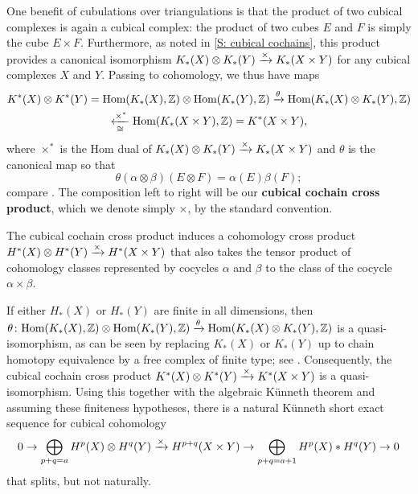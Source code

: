 One benefit of cubulations over triangulations is that the product of two cubical complexes is again a cubical complex: the product of two cubes $E$ and $F$ is simply the cube $E \times F$.
Furthermore, as noted in \cref{S: cubical cochains}, this product provides a canonical isomorphism $K_*(X) \otimes K_*(Y) \xrightarrow{\times} K_*(X \times Y)$ for any cubical complexes $X$ and $Y$.
Passing to cohomology, we thus have maps
\begin{multline*}
	K^*(X) \otimes K^*(Y) = \textup{Hom}(K_*(X), \mathbb{Z}) \otimes \textup{Hom}(K_*(Y), \mathbb{Z}) \xrightarrow{\theta} \textup{Hom}(K_*(X) \otimes K_*(Y),\mathbb{Z}) \\ \underset{\cong}{\xleftarrow{\times^*}} \textup{Hom}(K_*(X \times Y),\mathbb{Z}) = K^*(X \times Y),
\end{multline*}
where $\times^*$ is the Hom dual of $K_*(X) \otimes K_*(Y) \xrightarrow{\times} K_*(X \times Y)$ and $\theta$ is the canonical map so that $$\theta(\alpha \otimes \beta)(E \otimes F) = \alpha(E)\beta(F);$$ compare \cite[Sections 60,61]{Mun84}.
The composition left to right will be our \textbf{cubical cochain cross product}, which we denote simply $\times$, by the standard convention.

The cubical cochain cross product induces a cohomology cross product $H^*(X) \otimes H^*(Y) \xrightarrow{\times} H^*(X \times Y)$ that also takes the tensor product of cohomology classes represented by cocycles $\alpha$ and $\beta$ to the class of the cocycle $\alpha \times \beta$.

If either $H_*(X)$ or $H_*(Y)$ are finite in all dimensions, then $\theta \colon \textup{Hom}(K_*(X), \mathbb{Z}) \otimes \textup{Hom}(K_*(Y), \mathbb{Z}) \xrightarrow{\theta} \textup{Hom}(K_*(X) \otimes K_*(Y),\mathbb{Z})$ is a quasi-isomorphism, as can be seen by replacing $K_*(X)$ or $K_*(Y)$ up to chain homotopy equivalence by a free complex of finite type; see \cite[Lemma 5.5.6 and 5.5.9]{Span81}.
Consequently, the cubical cochain cross product $K^*(X) \otimes K^*(Y) \xrightarrow{\times}  K^*(X \times Y)$ is a quasi-isomorphism.
Using this together with the algebraic K\"unneth theorem \cite[Theorem V.2.1]{HS} and assuming these finiteness hypotheses, there is a natural K\"unneth short exact sequence for cubical cohomology
	\[
	0 \to \bigoplus_{p+q = a}H^p(X) \otimes H^q(Y) \xrightarrow{\times} H^{p+q}(X \times Y) \to \bigoplus_{p+q = a+1} H^p(X)* H^q(Y) \to 0
	\]
that splits, but not naturally.

